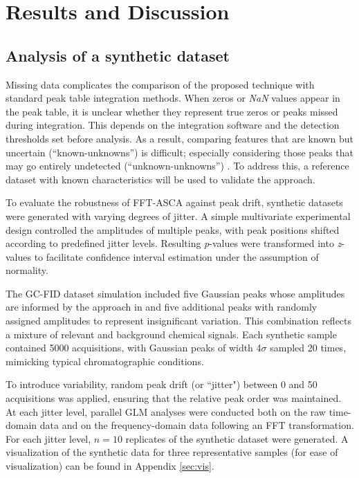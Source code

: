 \documentclass[preprint,12pt]{elsarticle}
\begin{document}
\section{Results and Discussion}

\subsection{Analysis of a synthetic dataset}\label{sec:2.1}

Missing data complicates the comparison of the proposed technique with standard peak table integration methods. When zeros or \textit{NaN} values appear in the peak table, it is unclear whether they represent true zeros or peaks missed during integration. This depends on the integration software and the detection thresholds set before analysis. As a result, comparing features that are known but uncertain (“known-unknowns”) is difficult; especially considering those peaks that may go entirely undetected (“unknown-unknowns”) \cite{rumsfeld2002}. To address this, a reference dataset with known characteristics will be used to validate the approach.

To evaluate the robustness of FFT-ASCA against peak drift, synthetic datasets were generated with varying degrees of jitter. A simple multivariate experimental design controlled the amplitudes of multiple peaks, with peak positions shifted according to predefined jitter levels. Resulting \textit{p}-values were transformed into \textit{z}-values to facilitate confidence interval estimation under the assumption of normality.

The GC-FID dataset simulation included five Gaussian peaks whose amplitudes are informed by the approach in \cite{Camacho2016} and five additional peaks with randomly assigned amplitudes to represent insignificant variation. This combination reflects a mixture of relevant and background chemical signals. Each synthetic sample contained 5000 acquisitions, with Gaussian peaks of width 4$\sigma$ sampled 20 times, mimicking typical chromatographic conditions.

To introduce variability, random peak drift (or ``jitter") between 0 and 50 acquisitions was applied, ensuring that the relative peak order was maintained. At each jitter level, parallel GLM analyses were conducted both on the raw time-domain data and on the frequency-domain data following an FFT transformation. For each jitter level, $n=10$ replicates of the synthetic dataset were generated. A visualization of the synthetic data for three representative samples (for ease of visualization) can be found in Appendix \ref{sec:vis}.
\end{document}
